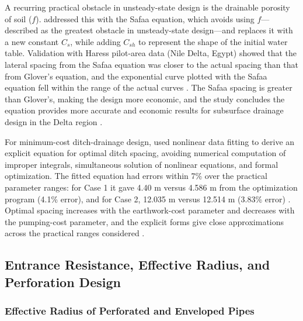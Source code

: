 A recurring practical obstacle in unsteady-state design is the drainable porosity of soil
($f$). \textcite{FathAllah2025} addressed this with the Safaa equation, which avoids using
$f$---described as the greatest obstacle in unsteady-state design---and replaces it with a
new constant $C_s$, while adding $C_{sh}$ to represent the shape of the initial water
table. Validation with Haress pilot-area data (Nile Delta, Egypt) showed that the lateral
spacing from the Safaa equation was closer to the actual spacing than that from Glover's
equation, and the exponential curve plotted with the Safaa equation fell within the range
of the actual curves \parencite{FathAllah2025}. The Safaa spacing is greater than
Glover's, making the design more economic, and the study concludes the equation provides
more accurate and economic results for subsurface drainage design in the Delta region
\parencite{FathAllah2025}.

For minimum-cost ditch-drainage design, \textcite{Chahar2010} used nonlinear data fitting
to derive an explicit equation for optimal ditch spacing, avoiding numerical computation
of improper integrals, simultaneous solution of nonlinear equations, and formal
optimization. The fitted equation had errors within 7\% over the practical parameter
ranges: for Case 1 it gave 4.40 m versus 4.586 m from the optimization program (4.1\%
error), and for Case 2, 12.035 m versus 12.514 m (3.83\% error) \parencite{Chahar2010}.
Optimal spacing increases with the earthwork-cost parameter and decreases with the
pumping-cost parameter, and the explicit forms give close approximations across the
practical ranges considered \parencite{Chahar2010}.

\subsection{Entrance Resistance, Effective Radius, and Perforation Design}

\subsubsection{Effective Radius of Perforated and Enveloped Pipes}


